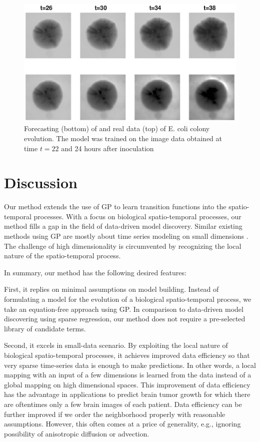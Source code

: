 \documentclass[11pt, reqno]{amsart}
\begin{document}
\begin{figure}[h]
\centerline{\includegraphics[width=\textwidth]{chapterGP/figures/ecoli100by100}}
\caption[]{\label{fig:ecoli} Forecasting (bottom) of and real data (top) of E. coli colony evolution. The model was trained on the image data obtained at time $t=22$ and 24 hours after inoculation}
\end{figure}


\section{Discussion} \label{sec:GP-conclude}
Our method extends the use of GP to learn transition functions into the spatio-temporal processes. With a focus on biological spatio-temporal processes, our method fills a gap in the field of data-driven model discovery. Similar existing methods using GP are mostly about time series modeling on small dimensions \citep{Roberts2013}. The challenge of high dimensionality is circumvented by recognizing the local nature of the spatio-temporal process.

In summary, our method has the following desired features:

First, it replies on minimal assumptions on model building. Instead of formulating a model for the evolution of a biological spatio-temporal process, we take an equation-free approach using GP. In comparison to data-driven model discovering using sparse regression, our method does not require a pre-selected library of candidate terms.

Second, it excels in small-data scenario. By exploiting the local nature of biological spatio-temporal processes, it achieves improved data efficiency so that very sparse time-series data is enough to make predictions. In other words, a local mapping with an input of a few dimensions is learned from the data instead of a global mapping on high dimensional spaces. This improvement of data efficiency has the advantage in applications to predict brain tumor growth for which there are oftentimes only a few brain images of each patient. Data efficiency can be further improved if we order the neighborhood properly with reasonable assumptions. However, this often comes at a price of generality, e.g., ignoring possibility of anisotropic diffusion or advection.   
\end{document}
